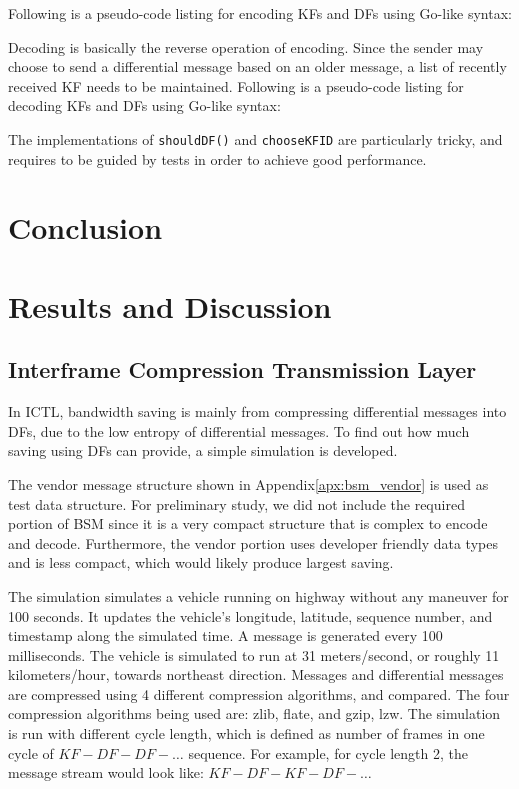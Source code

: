 \documentclass[12pt]{report}
\begin{document}
Following is a pseudo-code listing for encoding KFs and DFs using Go-like syntax:

\begin{singlespace}
  
\end{singlespace}

Decoding is basically the reverse operation of encoding. Since the sender may choose to send a differential message based on an older message, a list of recently received KF needs to be maintained. Following is a pseudo-code listing for decoding KFs and DFs using Go-like syntax:

\begin{singlespace}
  
\end{singlespace}

The implementations of \texttt{shouldDF()} and \texttt{chooseKFID} are particularly tricky, and requires to be guided by tests in order to achieve good performance.


\chapter{Conclusion}

\chapter{Results and Discussion}

\section{Interframe Compression Transmission Layer}
\label{sec:ictl_simulation}
In ICTL, bandwidth saving is mainly from compressing differential messages into DFs, due to the low entropy of differential messages. To find out how much saving using DFs can provide, a simple simulation is developed.

The vendor message structure shown in Appendix\ref{apx:bsm_vendor} is used as test data structure. For preliminary study, we did not include the required portion of BSM since it is a very compact structure that is complex to encode and decode. Furthermore, the vendor portion uses developer friendly data types and is less compact, which would likely produce largest saving.

The simulation simulates a vehicle running on highway without any maneuver for 100 seconds. It updates the vehicle's longitude, latitude, sequence number, and timestamp along the simulated time. A message is generated every 100 milliseconds. The vehicle is simulated to run at 31 meters/second, or roughly 11 kilometers/hour, towards northeast direction. Messages and differential messages are compressed using 4 different compression algorithms, and compared. The four compression algorithms being used are: zlib\cite{rfc1950}, flate\cite{rfc1951}, and gzip\cite{rfc1952}, lzw\cite{welch1984lzw}. The simulation is run with different cycle length, which is defined as number of frames in one cycle of $KF-DF-DF-\ldots$ sequence. For example, for cycle length 2, the message stream would look like: $KF-DF-KF-DF-\ldots$
\end{document}
